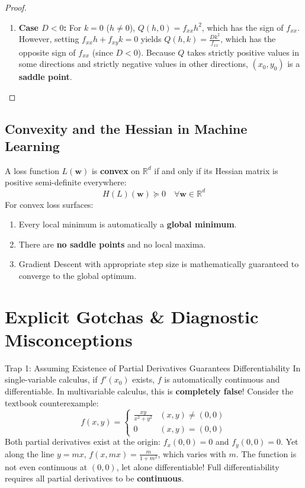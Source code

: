 \begin{proof}
\begin{enumerate}
\begin{itemize}
        \item If $f_{xx} < 0$, then $Q(h, k) < 0$ for all $(h, k) \neq (0, 0)$, so $(x_0, y_0)$ is a \textbf{strict local maximum}.
    \end{itemize}
    \item \textbf{Case $D < 0$:} For $k = 0$ ($h \neq 0$), $Q(h, 0) = f_{xx} h^2$, which has the sign of $f_{xx}$.
    However, setting $f_{xx} h + f_{xy} k = 0$ yields $Q(h, k) = \frac{D k^2}{f_{xx}}$, which has the opposite sign of $f_{xx}$ (since $D < 0$).
    Because $Q$ takes strictly positive values in some directions and strictly negative values in other directions, $(x_0, y_0)$ is a \textbf{saddle point}.
\end{enumerate}
\end{proof}

\subsection{Convexity and the Hessian in Machine Learning}

A loss function $L(\mathbf{w})$ is \textbf{convex} on $\mathbb{R}^d$ if and only if its Hessian matrix is positive semi-definite everywhere:
\begin{equation}
H(L)(\mathbf{w}) \succeq 0 \quad \forall \mathbf{w} \in \mathbb{R}^d
\end{equation}
For convex loss surfaces:
\begin{enumerate}
    \item Every local minimum is automatically a \textbf{global minimum}.
    \item There are \textbf{no saddle points} and no local maxima.
    \item Gradient Descent with appropriate step size is mathematically guaranteed to converge to the global optimum.
\end{enumerate}

\section{Explicit Gotchas \& Diagnostic Misconceptions}

\begin{trapbox}{Trap 1: Assuming Existence of Partial Derivatives Guarantees Differentiability}
In single-variable calculus, if $f'(x_0)$ exists, $f$ is automatically continuous and differentiable. In multivariable calculus, this is \textbf{completely false}! Consider the textbook counterexample:
\begin{equation*}
f(x, y) = \begin{cases} \frac{x y}{x^2 + y^2} & (x, y) \neq (0, 0) \\ 0 & (x, y) = (0, 0) \end{cases}
\end{equation*}
Both partial derivatives exist at the origin: $f_x(0, 0) = 0$ and $f_y(0, 0) = 0$. Yet along the line $y = m x$, $f(x, mx) = \frac{m}{1 + m^2}$, which varies with $m$. The function is not even continuous at $(0, 0)$, let alone differentiable! Full differentiability requires all partial derivatives to be \textbf{continuous}.
\end{trapbox}


